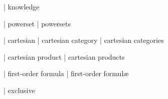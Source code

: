   | knowledge

  | powerset
  | powersets


  | cartesian
  | cartesian category
  | cartesian categories

  | cartesian product
  | cartesian products

  | first-order formula
  | first-order formul\ae{}

  | exclusive


